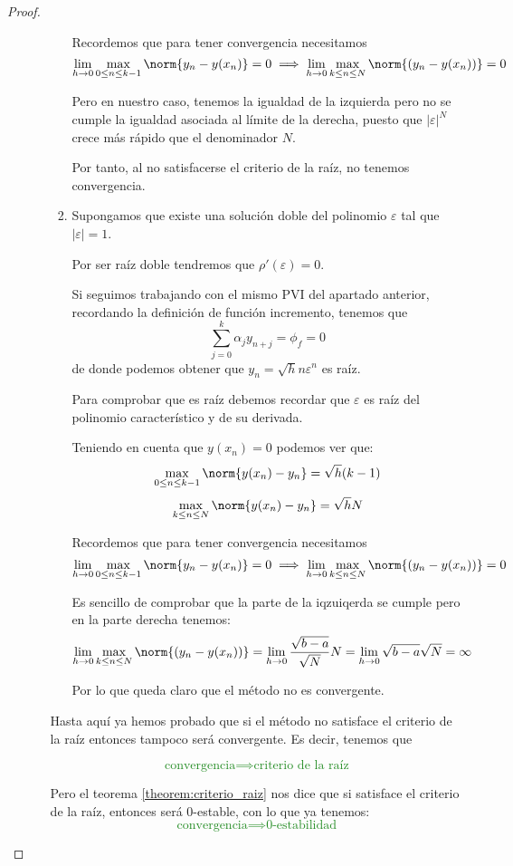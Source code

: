 \begin{proof}
\begin{itemize}
\begin{enumerate}
\begin{enumerate}
Recordemos que para tener convergencia necesitamos 
\[\lim_{h \to 0} \max_{0 \leq n \leq k-1} \norm{y_n-y(x_n)}= 0 \implies \lim_{h\to 0} \max_{k\leq n \leq N}\norm{(y_n-y(x_n))} = 0\]

Pero en nuestro caso, tenemos la igualdad de la izquierda pero no se cumple la igualdad asociada al límite de la derecha, puesto que $|ε|^N$ crece más rápido que el denominador $N$.

Por tanto, al no satisfacerse el criterio de la raíz, no tenemos convergencia.

\item Supongamos que existe una solución doble del polinomio $ε$ tal que $|ε|=1$. 

Por ser raíz doble tendremos que $ρ'(ε)=0$.

Si seguimos trabajando con el mismo PVI del apartado anterior, recordando la definición de función incremento, tenemos que
\[\sum_{j=0}^kα_jy_{n+j}=\phi_f = 0\]
de donde podemos obtener que $y_n = \sqrt{h}nε^n$ es raíz.

Para comprobar que es raíz debemos recordar que $ε$ es raíz del polinomio característico y de su derivada.

Teniendo en cuenta que $y(x_n)=0$ podemos ver que:
\[\max_{0\leq n \leq k-1} \norm{y(x_n)-y_n} = \sqrt{h}(k-1)\]
\[\max_{k \leq n \leq N} \norm{y(x_n)-y_n} = \sqrt{h}N\]

Recordemos que para tener convergencia necesitamos 
\[\lim_{h \to 0} \max_{0 \leq n \leq k-1} \norm{y_n-y(x_n)}= 0 \implies \lim_{h\to 0} \max_{k\leq n \leq N}\norm{(y_n-y(x_n))} = 0\]

Es sencillo de comprobar que la parte de la iqzuiqerda se cumple pero en la parte derecha tenemos:
\[\lim_{h\to 0} \max_{k\leq n \leq N}\norm{(y_n-y(x_n))} = \lim_{h\to 0} \frac{\sqrt{b-a}}{\sqrt{N}} N = \lim_{h\to 0} \sqrt{b-a}\sqrt{N} = \infty\]

Por lo que queda claro que el método no es convergente.
\end{enumerate}

Hasta aquí ya hemos probado que si el método no satisface el criterio de la raíz entonces tampoco será convergente. Es decir, tenemos que

\textcolor{ForestGreen}{\[\text{convergencia}\implies \text{criterio de la raíz}\]}

Pero el teorema \ref{theorem:criterio_raiz} nos dice que si satisface el criterio de la raíz, entonces será 0-estable, con lo que ya tenemos:
\textcolor{ForestGreen}{\[\text{convergencia}\implies \text{0-estabilidad}\]}


\end{enumerate}
\end{itemize}
\end{proof}
